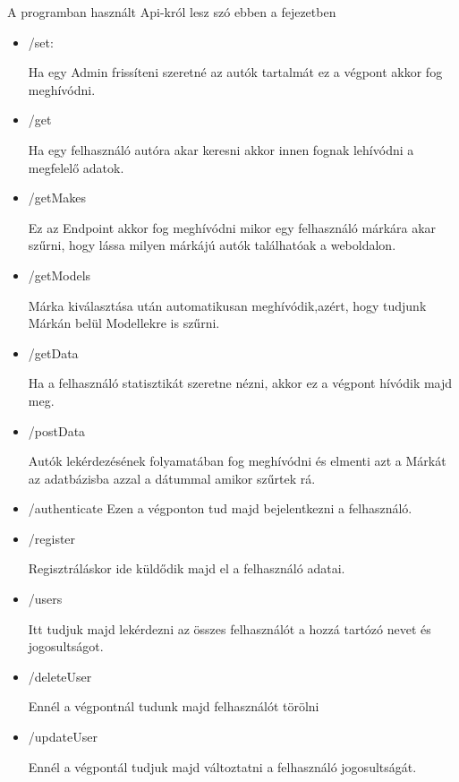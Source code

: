  
A programban használt Api-król lesz szó ebben a fejezetben
\begin{itemize}
\item /set:

Ha egy Admin frissíteni szeretné az autók tartalmát ez a végpont akkor fog meghívódni.
\item /get

Ha egy felhasználó autóra akar keresni akkor innen fognak lehívódni a megfelelő adatok.
\item /getMakes

Ez az Endpoint akkor fog meghívódni mikor egy felhasználó márkára akar szűrni, hogy lássa milyen márkájú autók találhatóak a weboldalon.
\item /getModels

Márka kiválasztása után automatikusan meghívódik,azért, hogy tudjunk Márkán belül Modellekre is szűrni.

\item /getData

Ha a felhasználó statisztikát szeretne nézni, akkor ez a végpont hívódik majd meg.
\item /postData

Autók lekérdezésének folyamatában fog meghívódni és elmenti azt a Márkát az adatbázisba azzal a dátummal amikor szűrtek rá.
\item /authenticate
Ezen a végponton tud majd bejelentkezni a felhasználó.

\item /register

Regisztráláskor ide küldődik majd el a felhasználó adatai.
\item /users

Itt tudjuk majd lekérdezni az összes felhasználót a hozzá tartózó nevet és jogosultságot.
\item /deleteUser

Ennél a végpontnál tudunk majd felhasználót törölni
\item /updateUser

Ennél  a végpontál tudjuk majd változtatni a felhasználó jogosultságát.

\end{itemize}









